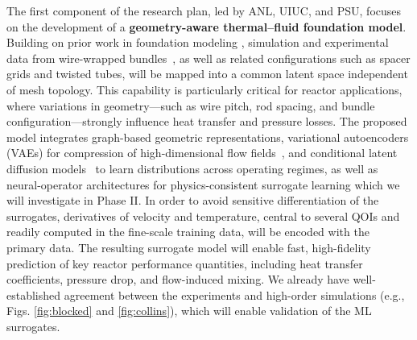 The first component of the research plan, led by ANL, UIUC, and PSU, focuses on
the development of a {\bf geometry-aware thermal–fluid foundation model}.
Building on prior work in foundation modeling \cite{Vishwasrao2026AgenticPDE},
simulation and experimental data from wire-wrapped
bundles~\cite{Dai2025WireWrapped61Pin,kaeri37pin}, as well as related
configurations such as spacer grids and twisted tubes, will be
mapped into {\rm a common latent space independent of mesh topology}. This
capability is particularly critical for reactor applications, where variations
in geometry—such as wire pitch, rod spacing, and bundle configuration—strongly
influence heat transfer and pressure losses.  The proposed model integrates
{\rm graph-based geometric representations}, {\rm variational autoencoders
(VAEs)} for compression of high-dimensional flow
fields~\cite{Vinuesa2022MLCFD,SoleraRico2024BetaVAE}, and {\rm conditional
latent diffusion models}~\cite{Vishwasrao2025DiffSPORT} to learn distributions
across operating regimes, as well as neural-operator architectures for
physics-consistent surrogate learning which we will investigate in Phase II.
In order to avoid sensitive differentiation of the surrogates,
derivatives of velocity and temperature, central to several QOIs and readily
computed in the fine-scale training data, will be encoded with the primary data.
The resulting surrogate model will enable fast, high-fidelity prediction of key
reactor performance quantities, including heat transfer coefficients, pressure
drop, and flow-induced mixing.  We already have well-established agreement
between the experiments and high-order simulations (e.g., Figs.
\ref{fig:blocked} and \ref{fig:collins}), which will enable validation of the
ML surrogates.


